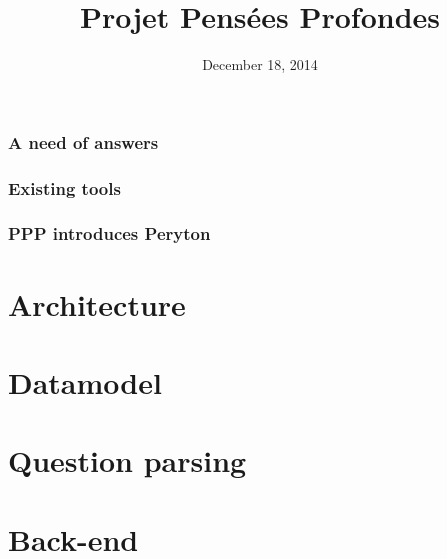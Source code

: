 \documentclass[10pt, compress]{beamer}
\title{Projet Pensées Profondes}
\subtitle{}
\date{December 18, 2014}
\institute{École Normale Supérieure de Lyon}
\begin{document}
\maketitle

\begin{frame}[fragile]
    \frametitle{A need of answers}
\end{frame}

\begin{frame}[fragile]
    \frametitle{Existing tools}
\end{frame}

\begin{frame}[fragile]
    \frametitle{PPP introduces Peryton}
\end{frame}

\section{Architecture}

\section{Datamodel}

\section{Question parsing}

\section{Back-end}

\end{document}
